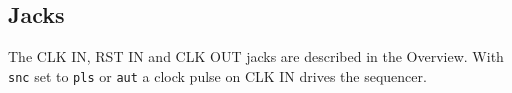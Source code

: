 \subsection{Jacks}\label{jacks}

The CLK IN, RST IN and CLK OUT jacks are described in the Overview. With
\texttt{snc} set to \texttt{pls} or \texttt{aut} a clock pulse on CLK IN
drives the sequencer.

